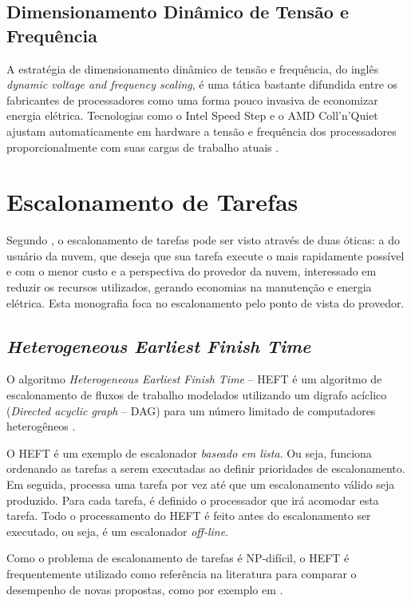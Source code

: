 \subsection{Dimensionamento Dinâmico de Tensão e Frequência}
\label{subsec:dvfs}
A estratégia de dimensionamento dinâmico de tensão e frequência, do inglês 
\emph{dynamic voltage and frequency scaling}, é uma tática 
bastante difundida entre os fabricantes de processadores como uma forma pouco
invasiva de economizar energia elétrica. Tecnologias como o Intel Speed Step
e o AMD Coll'n'Quiet ajustam automaticamente em hardware a tensão
e frequência dos processadores proporcionalmente com suas cargas de trabalho
atuais \cite{lago:escalonamento_com_prioridade_eficiente}.


\section{Escalonamento de Tarefas}
\label{sec:escalonamento_tarefas}
Segundo \cite{lago:escalonamento_com_prioridade_eficiente}, o escalonamento de 
tarefas pode ser visto através de duas óticas: a do usuário da nuvem, que deseja
que sua tarefa execute o mais rapidamente possível e com o menor custo e a 
perspectiva do provedor da nuvem, interessado em reduzir os recursos utilizados,
gerando economias na manutenção e energia elétrica. Esta monografia foca no
escalonamento pelo ponto de vista do provedor. 


\subsection{\emph{Heterogeneous Earliest Finish Time}}
\label{subsec:heft}
O algoritmo \emph{Heterogeneous Earliest Finish Time} -- HEFT é um algoritmo de
escalonamento de fluxos de trabalho modelados utilizando um digrafo acíclico
(\emph{Directed acyclic graph} -- DAG) para um número limitado de computadores
heterogêneos \cite{kim:virtual_computing}.

O HEFT é um exemplo de escalonador \emph{baseado em lista}. Ou seja, funciona
ordenando as tarefas a serem executadas ao definir prioridades de escalonamento.
Em seguida, processa uma tarefa por vez até que um escalonamento válido seja
produzido. Para cada tarefa, é definido o processador que irá acomodar esta
tarefa. Todo o processamento do HEFT é feito antes do escalonamento ser
executado, ou seja, é um escalonador \emph{off-line}.

Como o problema de escalonamento de
tarefas é NP-difícil, o HEFT é frequentemente utilizado como
referência na literatura para comparar o desempenho de novas propostas, 
como por exemplo em \cite{batista:embedding_software_requirements}.

